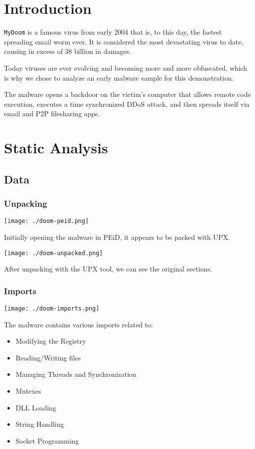 \documentclass[11pt]{article}
\date{\today}
\title{}
\begin{document}
\tableofcontents

\section{Introduction}
\label{sec:orgffcca08}
\texttt{MyDoom} is a famous virus from early 2004 that is, to this day, the
fastest spreading email worm ever. It is considered the most
devastating virus to date, causing in excess of 38 billion in damages.

Today viruses are ever evolving and becoming more and more obfuscated,
which is why we chose to analyze an early malware sample for this
demonstration.

The malware opens a backdoor on the victim's computer that allows
remote code execution, executes a time synchronized DDoS attack, and
then spreads itself via email and P2P filesharing apps.
\section{Static Analysis}
\label{sec:org0034396}
\subsection{Data}
\label{sec:org7e06409}
\subsubsection{Unpacking}
\label{sec:org844cc6f}
\begin{center}
\texttt{[image: ./doom-peid.png]}
\end{center}

Initially opening the malware in PEiD, it appears to be packed with
UPX.

\begin{center}
\texttt{[image: ./doom-unpacked.png]}
\end{center}

After unpacking with the UPX tool, we can see the original sections.
\subsubsection{Imports}
\label{sec:org28511f1}
\begin{center}
\texttt{[image: ./doom-imports.png]}
\end{center}

The malware contains various imports related to:
\begin{itemize}
\item Modifying the Registry
\item Reading/Writing files
\item Managing Threads and Synchronization
\item Mutexes
\item DLL Loading
\item String Handling
\item Socket Programming
\end{itemize}
\end{document}
